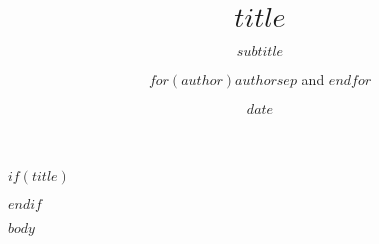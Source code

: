 \documentclass[
    fontsize=$if(font-size)$$font-size$$else$12pt$endif$,
    DIV=$if(page-div)$$page-div$$else$10$endif$,
    BCOR=0mm,
    oneside,
    abstract=on,
    appendixprefix=true]{scrreprt}
\title{$title$}
\subtitle{$subtitle$}
\author{$for(author)$$author$$sep$ and $endfor$}
\date{$date$}
\begin{document}
$if(title)$
  \maketitle
$endif$

$body$
\end{document}
